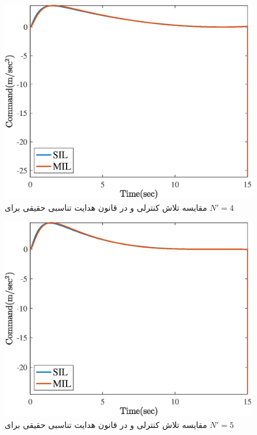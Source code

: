 \begin{figure}[H]
	\centering
	\includegraphics[width=.75\linewidth]{../Figure/Q2/d/command_2}
	\caption{مقایسه تلاش کنترلی  و 
		در قانون هدایت تناسبی حقیقی برای
		$N'=4$}
\end{figure}

\begin{figure}[H]
	\centering
	\includegraphics[width=.75\linewidth]{../Figure/Q2/d/command_3}
	\caption{مقایسه تلاش کنترلی  و 
		در قانون هدایت تناسبی حقیقی برای
		$N'=5$}
\end{figure}